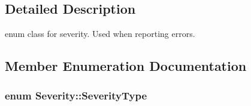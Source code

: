\subsection{Detailed Description}
enum class for severity. Used when reporting errors. 

\subsection{Member Enumeration Documentation}
\hypertarget{class_severity_ac185938ae084355bbf1790cf1a70caa6}{
\subsubsection[{Severity\-Type}]{\setlength{\rightskip}{0pt plus 5cm}enum {\bf Severity\-::\-Severity\-Type}}}\label{class_severity_ac185938ae084355bbf1790cf1a70caa6}
